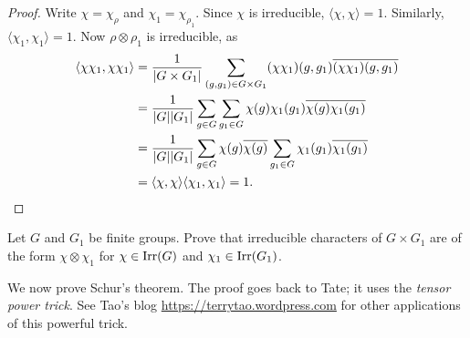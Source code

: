 \begin{proof}
    Write $\chi=\chi_{\rho}$ and $\chi_1=\chi_{\rho_1}$. Since
    $\chi$ is irreducible, $\langle\chi,\chi\rangle=1$. Similarly, 
    $\langle\chi_1,\chi_1\rangle=1$. Now
    $\rho\otimes\rho_1$ is irreducible, as 
    \begin{align*}
    \langle\chi\chi_1,\chi\chi_1\rangle
    &=\frac{1}{|G\times G_1|}\sum_{(g,g_1)\in G\times G_1}(\chi\chi_1)(g,g_1)\overline{(\chi\chi_1)(g,g_1)}\\
    &=\frac{1}{|G||G_1|}\sum_{g\in G}\sum_{g_1\in G}\chi(g)\chi_1(g_1)\overline{\chi(g)}\overline{\chi_1(g_1)}\\
    &=\frac{1}{|G||G_1|}\sum_{g\in G}\chi(g)\overline{\chi(g)}\sum_{g_1\in G}\chi_1(g_1)\overline{\chi_1(g_1)}\\
    &=\langle\chi,\chi\rangle\langle\chi_1,\chi_1\rangle=1.\qedhere 
    \end{align*}
\end{proof}

\begin{exercise}
    Let $G$ and $G_1$ be finite groups. 
    Prove that irreducible characters of $G\times G_1$ 
    are of the form $\chi\otimes\chi_1$ for  
    $\chi\in\operatorname{Irr}(G)$ and $\chi_1\in\operatorname{Irr}(G_1)$. 
\end{exercise}

We now prove Schur's theorem. The proof goes back to Tate; it uses the 
\emph{tensor power trick}. See
Tao's blog  
\url{https://terrytao.wordpress.com} for other applications of this powerful
trick. 

